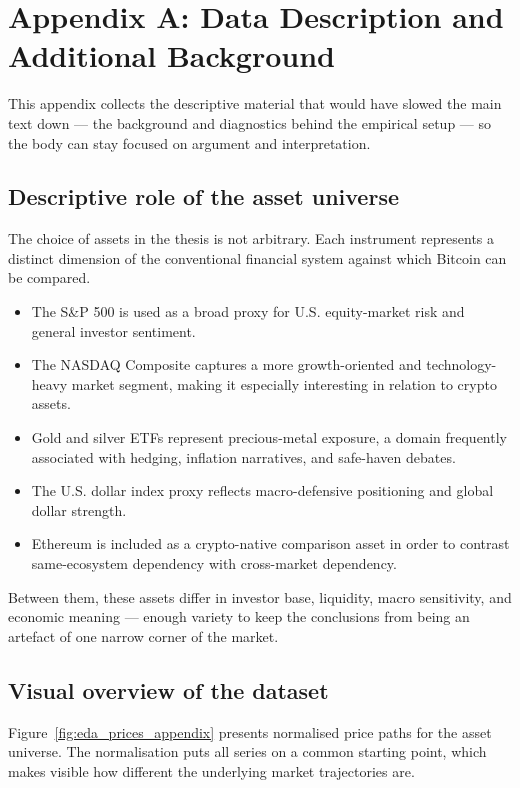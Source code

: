 ﻿\section{Appendix A: Data Description and Additional Background}

This appendix collects the descriptive material that would have slowed the main text down --- the background and diagnostics behind the empirical setup --- so the body can stay focused on argument and interpretation.

\subsection{Descriptive role of the asset universe}

The choice of assets in the thesis is not arbitrary. Each instrument represents a distinct dimension of the conventional financial system against which Bitcoin can be compared.

\begin{itemize}
    \item The S\&P 500 is used as a broad proxy for U.S. equity-market risk and general investor sentiment.
    \item The NASDAQ Composite captures a more growth-oriented and technology-heavy market segment, making it especially interesting in relation to crypto assets.
    \item Gold and silver ETFs represent precious-metal exposure, a domain frequently associated with hedging, inflation narratives, and safe-haven debates.
    \item The U.S. dollar index proxy reflects macro-defensive positioning and global dollar strength.
    \item Ethereum is included as a crypto-native comparison asset in order to contrast same-ecosystem dependency with cross-market dependency.
\end{itemize}

Between them, these assets differ in investor base, liquidity, macro sensitivity, and economic meaning --- enough variety to keep the conclusions from being an artefact of one narrow corner of the market.

\subsection{Visual overview of the dataset}

Figure~\ref{fig:eda_prices_appendix} presents normalised price paths for the asset universe. The normalisation puts all series on a common starting point, which makes visible how different the underlying market trajectories are.

